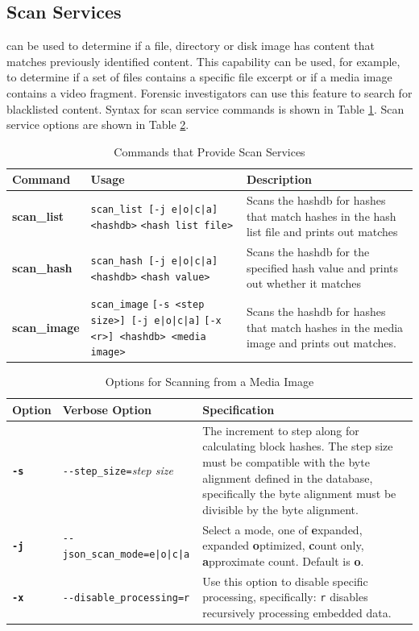 \documentclass[11pt,fleqn]{article} %
\begin{document}
\subsection{Scan Services}
\label{ScanServices}
\hdb can be used to determine if a file, directory or disk image has content that matches previously identified content. This capability can be used, for example, to determine if a set of files contains a specific file excerpt or if a media image contains a video fragment. Forensic investigators can use this feature to search for blacklisted content.
Syntax for scan service commands is shown in Table \ref{tab:scanServices}. Scan service options are shown in Table \ref{tab:ScanOptions}.\\

\begin{table}[!ht]
\centering
\caption{Commands that Provide Scan Services}
\label{tab:scanServices}
\begin{tabular}{|p{3.5 cm}|p{6 cm}|p{4 cm}|}
\hline \hline
\textbf{Command} & \textbf{Usage} & \textbf{Description} \\
\hline
\textbf{scan\_list} & \verb+scan_list [-j e|o|c|a] <hashdb>+ \verb+<hash list file>+ & Scans the hashdb for hashes that match hashes in the hash list file and prints out matches\\
\hline
\textbf{scan\_hash} & \verb+scan_hash [-j e|o|c|a] <hashdb>+ \verb+<hash value>+ & Scans the hashdb for the specified hash value and prints out whether it matches\\
\hline
\textbf{scan\_image} & \verb+scan_image+ \verb+[-s <step size>] [-j e|o|c|a]+ \verb+[-x <r>] <hashdb> <media image>+ & Scans the hashdb for hashes that match hashes in the media image and prints out matches.\\
\hline
\end{tabular}
\end{table}

\begin{table}[!ht]
\centering
\caption{Options for Scanning from a Media Image}
\label{tab:ScanOptions}
\begin{tabular}{|p{1.5 cm}|p{8 cm}|p{4 cm}|}
\hline \hline
\textbf{Option} & \textbf{Verbose Option} & \textbf{Specification} \\
\hline
\textbf{\texttt{-s}} & \verb+--step_size=+\textit{step size} & The increment to step along for calculating block hashes. The step size must be compatible with the byte alignment defined in the database, specifically the byte alignment must be divisible by the byte alignment.\\
\hline
\textbf{\texttt{-j}} & \verb+--json_scan_mode=e|o|c|a+ & Select a mode, one of \textbf{e}xpanded, expanded \textbf{o}ptimized, \textbf{c}ount only, \textbf{a}pproximate count. Default is \textbf{o}.\\
\hline
\textbf{\texttt{-x}} & \verb+--disable_processing=r+ & Use this option to disable specific processing, specifically: \verb+r+ disables recursively processing embedded data.\\
\hline
\end{tabular}
\end{table}
\end{document}
